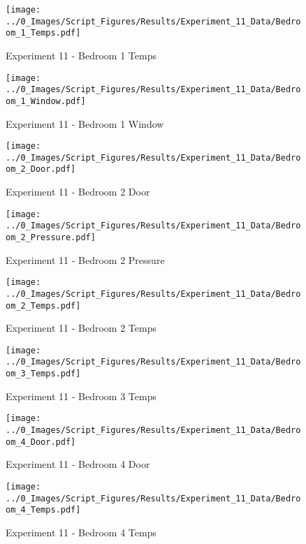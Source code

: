 	\begin{figure}[H]
		\centering
		\texttt{[image: ../0\_Images/Script\_Figures/Results/Experiment\_11\_Data/Bedroom\_1\_Temps.pdf]}
		\caption[]{Experiment 11 - Bedroom 1 Temps}
	\end{figure}
 
	\clearpage

	\begin{figure}[H]
		\centering
		\texttt{[image: ../0\_Images/Script\_Figures/Results/Experiment\_11\_Data/Bedroom\_1\_Window.pdf]}
		\caption[]{Experiment 11 - Bedroom 1 Window}
	\end{figure}
 

	\begin{figure}[H]
		\centering
		\texttt{[image: ../0\_Images/Script\_Figures/Results/Experiment\_11\_Data/Bedroom\_2\_Door.pdf]}
		\caption[]{Experiment 11 - Bedroom 2 Door}
	\end{figure}
 
	\clearpage

	\begin{figure}[H]
		\centering
		\texttt{[image: ../0\_Images/Script\_Figures/Results/Experiment\_11\_Data/Bedroom\_2\_Pressure.pdf]}
		\caption[]{Experiment 11 - Bedroom 2 Pressure}
	\end{figure}
 

	\begin{figure}[H]
		\centering
		\texttt{[image: ../0\_Images/Script\_Figures/Results/Experiment\_11\_Data/Bedroom\_2\_Temps.pdf]}
		\caption[]{Experiment 11 - Bedroom 2 Temps}
	\end{figure}
 
	\clearpage

	\begin{figure}[H]
		\centering
		\texttt{[image: ../0\_Images/Script\_Figures/Results/Experiment\_11\_Data/Bedroom\_3\_Temps.pdf]}
		\caption[]{Experiment 11 - Bedroom 3 Temps}
	\end{figure}
 

	\begin{figure}[H]
		\centering
		\texttt{[image: ../0\_Images/Script\_Figures/Results/Experiment\_11\_Data/Bedroom\_4\_Door.pdf]}
		\caption[]{Experiment 11 - Bedroom 4 Door}
	\end{figure}
 
	\clearpage

	\begin{figure}[H]
		\centering
		\texttt{[image: ../0\_Images/Script\_Figures/Results/Experiment\_11\_Data/Bedroom\_4\_Temps.pdf]}
		\caption[]{Experiment 11 - Bedroom 4 Temps}
	\end{figure}
 

